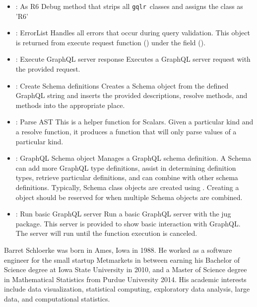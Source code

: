 \documentclass[stat,dissertation]{puthesis}\usepackage[]{graphicx}\usepackage{xcolor}
\newcommand{\pkg}[1]{\texttt{#1}}
\newcommand{\gqlr}{\pkg{gqlr}}
\newcommand{\tick}{\item[-]}
\begin{document}
\begin{itemize}
  \tick {}: As R6 \newline Debug method that strips all \gqlr~classes and assigns the class as 'R6'
  \tick {}: ErrorList \newline Handles all errors that occur during query validation. This object is returned from execute request function () under the field  ().
  \tick {}: Execute GraphQL server response \newline Executes a GraphQL server request with the provided request.
  \tick {}: Create Schema definitions \newline Creates a Schema object from the defined GraphQL string and inserts the provided descriptions, resolve methods, and  methods into the appropriate place.
  \tick {}: Parse AST \newline This is a helper function for Scalars. Given a particular kind and a resolve function, it produces a function that will only parse values of a particular kind.
  \tick {}: GraphQL Schema object \newline Manages a GraphQL schema definition. A Schema can add more GraphQL type definitions, assist in determining definition types, retrieve particular definitions, and can combine with other schema definitions. \newline Typically, Schema class objects are created using . Creating a  object should be reserved for when multiple Schema objects are combined.
  \tick {}: Run basic GraphQL server \newline Run a basic GraphQL server with the jug package. This server is provided to show basic interaction with GraphQL. The server will run until the function execution is canceled.
\end{itemize}


%
%
%
%

\begin{vita}
    Barret Schloerke was born in Ames, Iowa in 1988. He worked as a software engineer for the small startup Metmarkets in between earning his Bachelor of Science degree at Iowa State University in 2010, and a Master of Science degree in Mathematical Statistics from Purdue University 2014. His academic interests include data visualization, statistical computing, exploratory data analysis, large data, and computational statistics.

\end{vita}
\end{document}
